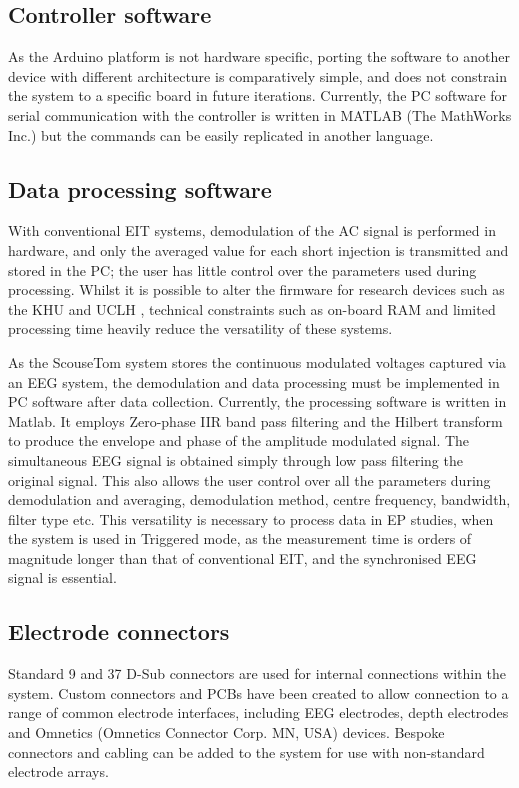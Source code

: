 
\subsection{Controller software}

As the Arduino platform is not hardware specific, porting the software to another device with different architecture is comparatively simple, and does not constrain the system to a specific board in future iterations. Currently, the PC software for serial communication with the controller is written in MATLAB (The MathWorks Inc.) but the commands can be easily replicated in another language.

\subsection{Data processing software}

With conventional EIT systems, demodulation of the AC signal is performed in hardware, and only the averaged value for each short injection is transmitted and stored in the PC; the user has little control over the parameters used during processing. Whilst it is possible to alter the firmware for research devices such as the KHU \cite{Hun_Wi_2014} and UCLH \cite{McEwan_2006}, technical constraints such as on-board RAM and limited processing time heavily reduce the versatility of these systems. 

As the ScouseTom system stores the continuous modulated voltages captured via an EEG system, the demodulation and data processing must be implemented in PC software after data collection. Currently, the processing software is written in Matlab. It employs Zero-phase IIR band pass filtering and the Hilbert transform to produce the envelope and phase of the amplitude modulated signal. The simultaneous EEG signal is obtained simply through low pass filtering the original signal. This also allows the user control over all the parameters during demodulation and averaging, demodulation method, centre frequency, bandwidth, filter type etc. This versatility is necessary to process data in EP studies, when the system is used in Triggered mode, as the measurement time is orders of magnitude longer than that of conventional EIT, and the synchronised EEG signal is essential. 

\subsection{Electrode connectors}

Standard 9 and 37 D-Sub connectors are used for internal connections within the system. Custom connectors and PCBs have been created to allow connection to a range of common electrode interfaces, including EEG electrodes, depth electrodes and Omnetics (Omnetics Connector Corp. MN, USA) devices. Bespoke connectors and cabling can be added to the system for use with non-standard electrode arrays.